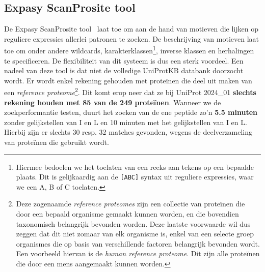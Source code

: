 \subsection{Expasy ScanProsite tool}
De Expasy ScanProsite tool~\cite{scanprosite} laat toe om aan de hand van motieven die lijken op reguliere expressies allerlei patronen te zoeken.
De beschrijving van motieven laat toe om onder andere wildcards, karakterklassen\footnote{Hiermee bedoelen we het toelaten van een reeks aan tekens op een bepaalde plaats. Dit is gelijkaardig aan de \texttt{[ABC]} syntax uit reguliere expressies, waar we een A, B of C toelaten.}, inverse klassen en herhalingen te specificeren.
De flexibiliteit van dit systeem is dus een sterk voordeel.
Een nadeel van deze tool is dat niet de volledige UniProtKB databank doorzocht wordt.
Er wordt enkel rekening gehouden met proteïnen die deel uit maken van een \textit{reference proteome}\footnote{Deze zogenaamde \textit{reference proteomes} zijn een collectie van proteïnen die door een bepaald organisme gemaakt kunnen worden, en die bovendien taxonomisch belangrijk bevonden worden. Deze laatste voorwaarde wil dus zeggen dat dit niet zomaar van elk organisme is, enkel van een selecte groep organismes die op basis van verschillende factoren belangrijk bevonden wordt. Een voorbeeld hiervan is de \textit{human reference proteome}. Dit zijn alle proteïnen die door een mens aangemaakt kunnen worden.}.
Dit komt erop neer dat ze bij UniProt 2024\_01 \textbf{slechts rekening houden met 85 van de 249 proteïnen}.
Wanneer we de zoekperformantie testen, duurt het zoeken van de ene peptide zo'n \textbf{5.5 minuten} zonder gelijkstellen van I en L en 10 minuten met het gelijkstellen van I en L\@.
Hierbij zijn er slechts 30 resp. 32 matches gevonden, wegens de deelverzameling van proteïnen die gebruikt wordt.

